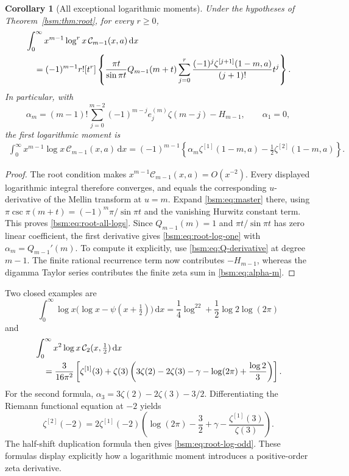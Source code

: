 \documentclass[11pt,letterpaper]{article}
\numberwithin{equation}{section}
\newtheorem{corollary}[theorem]{Corollary}
\theoremstyle{definition}\newtheorem{definition}[theorem]{Definition}
\theoremstyle{remark}\newtheorem{remark}[theorem]{Remark}
\newcommand{\dd}{\,\mathrm{d}}
\newcommand{\Ccal}{\mathcal C}
\newcommand{\Qcal}{Q}
\begin{document}
\begin{corollary}[All exceptional logarithmic moments]\label{bsm:cor:root-logs}
Under the hypotheses of Theorem~\ref{bsm:thm:root}, for every $r\ge0$,
\begin{align}\label{bsm:eq:root-all-logs}
 &\int_0^\infty x^{m-1}\log^r x\,\Ccal_{m-1}(x,a)\dd x\notag\\
 &\quad=(-1)^{m-1}r![t^r]\left\{
   \frac{\pi t}{\sin\pi t}\Qcal_{m-1}(m+t)
   \sum_{j=0}^{r}\frac{(-1)^j\zeta^{[j+1]}(1-m,a)}{(j+1)!}t^j
                                      \right\}.
\end{align}
In particular, with
\begin{equation}\label{bsm:eq:alpha-m}
 \alpha_m=(m-1)!\sum_{j=0}^{m-2}(-1)^{m-j}e_j^{(m)}\zeta(m-j)
                    -H_{m-1},\qquad \alpha_1=0,
\end{equation}
the first logarithmic moment is
\begin{align}\label{bsm:eq:root-log-one}
 \int_0^\infty x^{m-1}\log x\,\Ccal_{m-1}(x,a)\dd x
   =(-1)^{m-1}\left\{
       \alpha_m\zeta^{[1]}(1-m,a)-\frac12\zeta^{[2]}(1-m,a)
                  \right\}.
\end{align}
\end{corollary}
\begin{proof}
The root condition makes $x^{m-1}\Ccal_{m-1}(x,a)=O(x^{-2})$.
Every displayed logarithmic integral therefore converges, and equals
the corresponding $u$-derivative of the Mellin transform at $u=m$.
Expand \eqref{bsm:eq:master} there, using
$\pi\csc\pi(m+t)=(-1)^m\pi/\sin\pi t$ and the vanishing Hurwitz
constant term. This proves \eqref{bsm:eq:root-all-logs}.
Since $\Qcal_{m-1}(m)=1$ and $\pi t/\sin\pi t$ has zero linear
coefficient, the first derivative gives \eqref{bsm:eq:root-log-one}
with $\alpha_m=\Qcal_{m-1}'(m)$.
To compute it explicitly, use \eqref{bsm:eq:Q-derivative} at degree
$m-1$. The finite rational recurrence term now contributes
$-H_{m-1}$, whereas the digamma Taylor series contributes the finite
zeta sum in \eqref{bsm:eq:alpha-m}.
\end{proof}

Two closed examples are
\begin{equation}\label{bsm:eq:root-log-digamma}
 \int_0^\infty\log x\bigl(\log x-\psi(x+\tfrac12)\bigr)\dd x
      =\frac14\log^22+\frac12\log2\log(2\pi)
\end{equation}
and
\begin{align}\label{bsm:eq:root-log-odd}
 &\int_0^\infty x^2\log x\,\Ccal_2(x,\tfrac12)\dd x\notag\\
 &\quad=\frac3{16\pi^2}\left[
 \zeta^{[1]}(3)+\zeta(3)\left(
 3\zeta(2)-2\zeta(3)-\gamma-\log(2\pi)+\frac{\log2}{3}
                                      \right)\right].
\end{align}
For the second formula, $\alpha_3=3\zeta(2)-2\zeta(3)-3/2$.
Differentiating the Riemann functional equation at $-2$ yields
\[
 \zeta^{[2]}(-2)=2\zeta^{[1]}(-2)
       \left(\log(2\pi)-\frac32+\gamma
                         -\frac{\zeta^{[1]}(3)}{\zeta(3)}\right).
\]
The half-shift duplication formula then gives
\eqref{bsm:eq:root-log-odd}. These formulas display explicitly how a
logarithmic moment introduces a positive-order zeta derivative.
\end{document}
